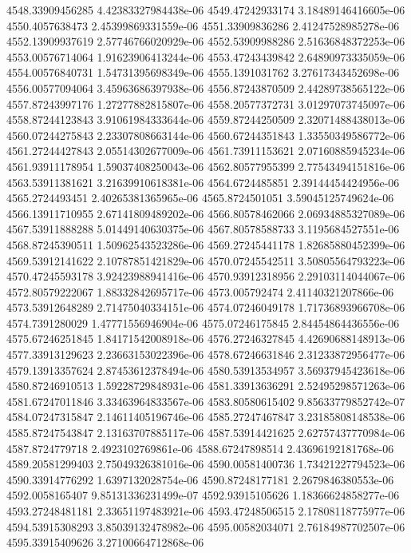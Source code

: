 {4548.33909456285 4.42383327984438e-06
4549.47242933174 3.18489146416605e-06
4550.4057638473 2.45399869331559e-06
4551.33909836286 2.41247528985278e-06
4552.13909937619 2.57746766020929e-06
4552.53909988286 2.51636848372253e-06
4553.00576714064 1.91623906413244e-06
4553.47243439842 2.64890973335059e-06
4554.00576840731 1.54731395698349e-06
4555.1391031762 3.27617343452698e-06
4556.00577094064 3.45963686397938e-06
4556.87243870509 2.44289738565122e-06
4557.87243997176 1.27277882815807e-06
4558.20577372731 3.01297073745097e-06
4558.87244123843 3.91061984333644e-06
4559.87244250509 2.32071488438013e-06
4560.07244275843 2.23307808663144e-06
4560.67244351843 1.33550349586772e-06
4561.27244427843 2.05514302677009e-06
4561.73911153621 2.07160885945234e-06
4561.93911178954 1.59037408250043e-06
4562.80577955399 2.77543494151816e-06
4563.53911381621 3.21639910618381e-06
4564.6724485851 2.39144454424956e-06
4565.2724493451 2.40265381365965e-06
4565.8724501051 3.59045125749624e-06
4566.13911710955 2.67141809489202e-06
4566.80578462066 2.06934885327089e-06
4567.53911888288 5.01449140630375e-06
4567.80578588733 3.1195684527551e-06
4568.87245390511 1.50962543523286e-06
4569.27245441178 1.82685880452399e-06
4569.53912141622 2.10787851421829e-06
4570.07245542511 3.50805564793223e-06
4570.47245593178 3.92423988941416e-06
4570.93912318956 2.29103114044067e-06
4572.80579222067 1.88332842695717e-06
4573.005792474 2.41140321207866e-06
4573.53912648289 2.71475040334151e-06
4574.07246049178 1.71736893966708e-06
4574.7391280029 1.47771556946904e-06
4575.07246175845 2.84454864436556e-06
4575.67246251845 1.84171542008918e-06
4576.27246327845 4.42690688148913e-06
4577.33913129623 2.23663153022396e-06
4578.67246631846 2.31233872956477e-06
4579.13913357624 2.87453612378494e-06
4580.53913534957 3.56937945423618e-06
4580.87246910513 1.59228729848931e-06
4581.33913636291 2.52495298571263e-06
4581.67247011846 3.33463964833567e-06
4583.80580615402 9.85633779852742e-07
4584.07247315847 2.14611405196746e-06
4585.27247467847 3.23185808148538e-06
4585.87247543847 2.13163707885117e-06
4587.53914421625 2.62757437770984e-06
4587.8724779718 2.4923102769861e-06
4588.67247898514 2.43696192181768e-06
4589.20581299403 2.75049326381016e-06
4590.00581400736 1.73421227794523e-06
4590.33914776292 1.6397132028754e-06
4590.87248177181 2.2679846380553e-06
4592.0058165407 9.85131336231499e-07
4592.93915105626 1.18366624858277e-06
4593.27248481181 2.33651197483921e-06
4593.47248506515 2.17808118775977e-06
4594.53915308293 3.85039132478982e-06
4595.00582034071 2.76184987702507e-06
4595.33915409626 3.27100664712868e-06
}
